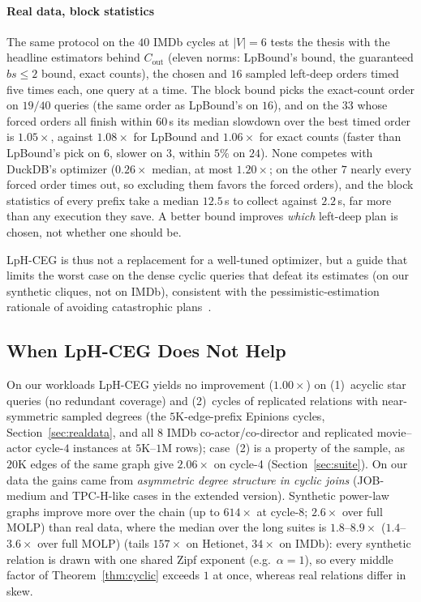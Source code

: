 \documentclass[conference]{IEEEtran}
\begin{document}
\paragraph{Real data, block statistics} The same protocol on the $40$
IMDb cycles at $|V|{=}6$ tests the thesis with the headline estimators
behind $C_{\mathrm{out}}$ (eleven norms: LpBound's bound, the guaranteed
$bs{\le}2$ bound, exact counts), the chosen and $16$ sampled left-deep orders
timed five times each, one query at a time. The block bound picks the
exact-count order on $19/40$ queries (the same order as LpBound's on $16$), and on the
$33$ whose forced orders all finish within $60$\,s its median slowdown over
the best timed order is $1.05\times$, against $1.08\times$ for LpBound and
$1.06\times$ for exact counts (faster than LpBound's pick on $6$, slower on
$3$, within $5\%$ on $24$). None competes with DuckDB's optimizer
($0.26\times$ median, at most $1.20\times$; on the other $7$ nearly every forced order times out, so excluding them favors the forced orders), and the block statistics of every
prefix take a median $12.5$\,s to collect against $2.2$\,s, far more than any
execution they save. A better bound improves \emph{which} left-deep plan is
chosen, not whether one should be.

LpH-CEG is thus not a replacement for a
well-tuned optimizer, but a guide that limits the worst case on the
dense cyclic queries that defeat its estimates (on our synthetic cliques,
not on IMDb), consistent with the pessimistic-estimation rationale of avoiding catastrophic plans~\cite{cai2019pessimistic}.

\subsection{When LpH-CEG Does Not Help}
\label{sec:noimprove}

On our workloads LpH-CEG yields no improvement ($1.00\times$) on
(1)~acyclic star queries (no redundant coverage) and (2)~cycles of replicated relations with
near-symmetric sampled degrees (the $5$K-edge-prefix Epinions cycles,
Section~\ref{sec:realdata}, and all $8$ IMDb co-actor/co-director and
replicated movie--actor cycle-$4$ instances at $5$K--$1$M rows); case~(2) is a property of the sample, as $20$K
edges of the same graph give $2.06\times$ on cycle-4
(Section~\ref{sec:suite}). On our data the gains came from \emph{asymmetric degree structure in cyclic joins} (JOB-medium and TPC-H-like cases in the extended version). Synthetic power-law graphs improve more over the chain (up to
$614\times$ at cycle-8; $2.6\times$ over full MOLP) than real data, where the median over the long
suites is $1.8$--$8.9\times$ ($1.4$--$3.6\times$ over full MOLP) (tails $157\times$ on Hetionet, $34\times$
on IMDb): every synthetic relation is drawn with one shared Zipf exponent (e.g.\ $\alpha{=}1$), so every middle factor of Theorem~\ref{thm:cyclic} exceeds $1$ at once, whereas real relations differ in skew.
\end{document}
